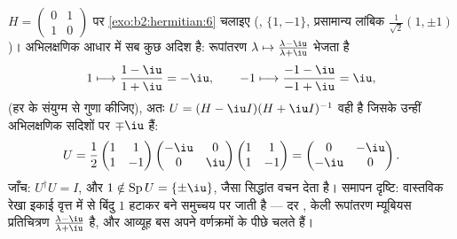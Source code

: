 \begin{example}[केली रूपांतरण, परिकलित]\label{ex:b2:hermitian:cayleyrun}
$H = \begin{pmatrix} 0 & 1\\
1 & 0\end{pmatrix}$ पर \cref{exo:b2:hermitian:6} चलाइए (,  $\{1, -1\}$, प्रसामान्य लांबिक  $\frac{1}{\sqrt2}(1, \pm1)$)। अभिलक्षणिक आधार में सब कुछ अदिश है: रूपांतरण $\lambda
\mapsto \frac{\lambda - \iu}{\lambda + \iu}$ भेजता है
\[
1 \longmapsto \frac{1 - \iu}{1 + \iu} = -\iu,
\qquad
-1 \longmapsto \frac{-1 - \iu}{-1 + \iu} = \iu ,
\]
(हर के संयुग्म से गुणा कीजिए), अतः $U = (H -
\iu I)(H + \iu I)^{-1}$ वही  है जिसके उन्हीं
अभिलक्षणिक सदिशों पर  $\mp\iu$ हैं:
\[
U = \frac{1}{2}\begin{pmatrix} 1 & 1\\ 1 & -1\end{pmatrix}
\begin{pmatrix} -\iu & 0\\ 0 & \iu\end{pmatrix}
\begin{pmatrix} 1 & 1\\ 1 & -1\end{pmatrix}
= \begin{pmatrix} 0 & -\iu\\ -\iu & 0\end{pmatrix} .
\]
जाँच: $U^\dagger U = I$, और $1 \notin \operatorname{Sp}U =
\{\pm\iu\}$, जैसा सिद्धांत वचन देता है। समापन दृष्टि: वास्तविक
रेखा इकाई वृत्त में से बिंदु $1$ हटाकर बने समुच्चय पर जाती है ---
 दर , केली रूपांतरण म्यूबियस प्रतिचित्रण $\frac{\lambda-\iu}{\lambda+\iu}$
है, और आव्यूह बस अपने वर्णक्रमों के पीछे चलते हैं।
\end{example}

